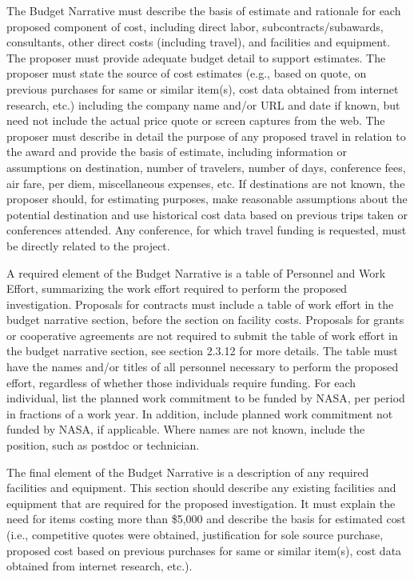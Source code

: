 \documentclass[12pt]{article}
\begin{document}
The Budget Narrative must describe the basis of estimate and rationale
for each proposed component of cost, including direct labor,
subcontracts/subawards, consultants, other direct costs (including
travel), and facilities and equipment. The proposer must provide
adequate budget detail to support estimates. The proposer must state
the source of cost estimates (e.g., based on quote, on previous
purchases for same or similar item(s), cost data obtained from
internet research, etc.) including the company name and/or URL and
date if known, but need not include the actual price quote or screen
captures from the web. The proposer must describe in detail the
purpose of any proposed travel in relation to the award and provide
the basis of estimate, including information or assumptions on
destination, number of travelers, number of days, conference fees, air
fare, per diem, miscellaneous expenses, etc. If destinations are not
known, the proposer should, for estimating purposes, make reasonable
assumptions about the potential destination and use historical cost
data based on previous trips taken or conferences attended. Any
conference, for which travel funding is requested, must be directly
related to the project.

A required element of the Budget Narrative is a table of Personnel and
Work Effort, summarizing the work effort required to perform the
proposed investigation. Proposals for contracts must include a table
of work effort in the budget narrative section, before the section on
facility costs. Proposals for grants or cooperative agreements are not
required to submit the table of work effort in the budget narrative
section, see section 2.3.12 for more details. The table must have the
names and/or titles of all personnel necessary to perform the proposed
effort, regardless of whether those individuals require funding. For
each individual, list the planned work commitment to be funded by
NASA, per period in fractions of a work year. In addition, include
planned work commitment not funded by NASA, if applicable. Where names
are not known, include the position, such as postdoc or technician.

The final element of the Budget Narrative is a description of any
required facilities and equipment. This section should describe any
existing facilities and equipment that are required for the proposed
investigation. It must explain the need for items costing more than
\$5,000 and describe the basis for estimated cost (i.e., competitive
quotes were obtained, justification for sole source purchase, proposed
cost based on previous purchases for same or similar item(s), cost
data obtained from internet research, etc.).
\end{document}
